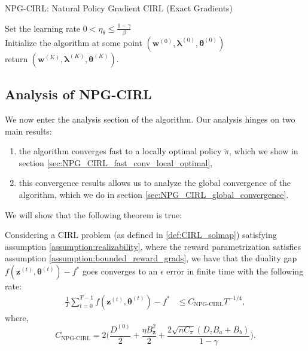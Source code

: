 \begin{algorithm}
    \SetAlgoLined
  \small
    \caption{NPG-CIRL: Natural Policy Gradient CIRL (Exact Gradients)} 
    \label{alg:npg-cirl}
      Set the learning rate $0<\eta_\theta \leq \frac{1-\gamma}{\beta}$ \\
      Initialize the algorithm at some point $(\bm{w}^{(0)},\bm{\lambda}^{(0)},\bm{\theta}^{(0)})$  \\
      return $(\bm{w}^{(K)},\bm{\lambda}^{(K)},\bm{\theta}^{(K)})$.
  \end{algorithm}

\subsection{Analysis of NPG-CIRL}

We now enter the analysis section of the algorithm. Our analysis hinges on two main results:
\begin{enumerate}
    \item the algorithm converges fast to a locally optimal policy $\tilde{\pi}$, which we show in section \ref{sec:NPG_CIRL_fast_conv_local_optimal},
    \item this convergence results allows us to analyze the global convergence of the algorithm, which we do in section  \ref{sec:NPG_CIRL_global_convergence}.
\end{enumerate}

We will show that the following theorem is true:
\begin{theorem}
    \label{thm:global_conv_npg_cirl}
    Considering a CIRL problem (as defined in \ref{def:CIRL_solmap}) satisfying assumption \ref{assumption:realizability}, where the reward parametrization satisfies assumption \ref{assumption:bounded_reward_grads}, we have that the duality gap $f(\bm{z}^{(t)},\bm{\theta}^{(t)}) - f^*$ goes converges to an $\epsilon$ error in finite time with the following rate:
    \begin{align*}
        \frac{1}{T} \sum_{t=0}^{T-1} f(\bm{z}^{(t)},\bm{\theta}^{(t)}) - f^* 
        &\leq C_\text{NPG-CIRL} T^{-1/4},
    \end{align*}
    where, 
    \[C_\text{NPG-CIRL} = 2\Bigg(\frac{D^{(0)} }{2} +\frac{\eta B_{\bm{z}}^2}{2} + \frac{2 \sqrt{n C_\pi}  (D_z B_a+B_b)}{1 - \gamma}
    \Bigg).\]
\end{theorem}

